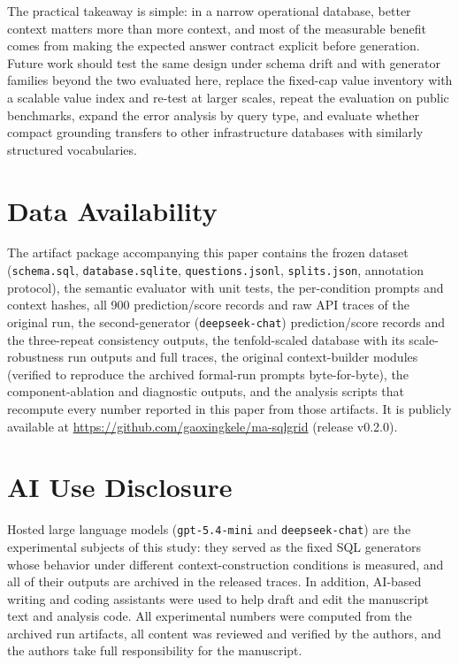 \documentclass{ieeeaccess}
\begin{document}
The practical takeaway is simple: in a narrow operational database, better context matters more than more context, and most of the measurable benefit comes from making the expected answer contract explicit before generation. Future work should test the same design under schema drift and with generator families beyond the two evaluated here, replace the fixed-cap value inventory with a scalable value index and re-test at larger scales, repeat the evaluation on public benchmarks, expand the error analysis by query type, and evaluate whether compact grounding transfers to other infrastructure databases with similarly structured vocabularies.


\section*{Data Availability}

The artifact package accompanying this paper contains the frozen dataset (\texttt{schema.sql}, \texttt{database.sqlite}, \texttt{questions.jsonl}, \texttt{splits.json}, annotation protocol), the semantic evaluator with unit tests, the per-condition prompts and context hashes, all 900 prediction/score records and raw API traces of the original run, the second-generator (\texttt{deepseek-chat}) prediction/score records and the three-repeat consistency outputs, the tenfold-scaled database with its scale-robustness run outputs and full traces, the original context-builder modules (verified to reproduce the archived formal-run prompts byte-for-byte), the component-ablation and diagnostic outputs, and the analysis scripts that recompute every number reported in this paper from those artifacts. It is publicly available at \url{https://github.com/gaoxingkele/ma-sqlgrid} (release v0.2.0).

\section*{AI Use Disclosure}

Hosted large language models (\texttt{gpt-5.4-mini} and \texttt{deepseek-chat}) are the experimental subjects of this study: they served as the fixed SQL generators whose behavior under different context-construction conditions is measured, and all of their outputs are archived in the released traces. In addition, AI-based writing and coding assistants were used to help draft and edit the manuscript text and analysis code. All experimental numbers were computed from the archived run artifacts, all content was reviewed and verified by the authors, and the authors take full responsibility for the manuscript.
\end{document}
